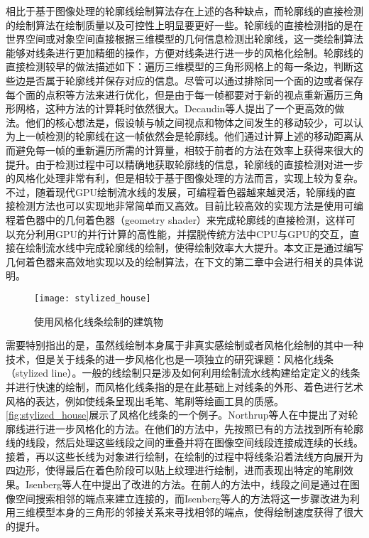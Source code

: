 相比于基于图像处理的轮廓线绘制算法存在上述的各种缺点，而轮廓线的直接检测的绘制算法在绘制质量以及可控性上明显要更好一些。轮廓线的直接检测指的是在世界空间或对象空间直接根据三维模型的几何信息检测出轮廓线，这一类绘制算法能够对线条进行更加精细的操作，方便对线条进行进一步的风格化绘制。轮廓线的直接检测较早的做法\cite{marshall2001cartoon}描述如下：遍历三维模型的三角形网格上的每一条边，判断这些边是否属于轮廓线并保存对应的信息。尽管可以通过排除同一个面的边或者保存每个面的点积等方法来进行优化，但是由于每一帧都要对于新的视点重新遍历三角形网格，这种方法的计算耗时依然很大。Decaudin等人提出了一个更高效的做法\cite{decaudin1996cartoon}。他们的核心想法是，假设帧与帧之间视点和物体之间发生的移动较少，可以认为上一帧检测的轮廓线在这一帧依然会是轮廓线。他们通过计算上述的移动距离从而避免每一帧的重新遍历所需的计算量，相较于前者的方法在效率上获得来很大的提升。由于检测过程中可以精确地获取轮廓线的信息，轮廓线的直接检测对进一步的风格化处理非常有利，但是相较于基于图像处理的方法而言，实现上较为复杂。不过，随着现代GPU绘制流水线的发展，可编程着色器越来越灵活，轮廓线的直接检测方法也可以实现地非常简单而又高效。目前比较高效的实现方法是使用可编程着色器中的几何着色器（geometry shader）来完成轮廓线的直接检测，这样可以充分利用GPU的并行计算的高性能，并摆脱传统方法中CPU与GPU的交互，直接在绘制流水线中完成轮廓线的绘制，使得绘制效率大大提升。本文正是通过编写几何着色器来高效地实现\con{}以及\scon{}的绘制算法，在下文的第二章中会进行相关的具体说明。

\begin{figure}[tbh]
    \centering
    \texttt{[image: stylized\_house]}
    \caption[使用风格化线条绘制的建筑物]{\label{fig:stylized_house}
    使用风格化线条绘制的建筑物\cite{northrup2000artistic}}
\end{figure}

需要特别指出的是，虽然线绘制本身属于非真实感绘制或者风格化绘制的其中一种技术，但是关于线条的进一步风格化也是一项独立的研究课题：风格化线条（stylized line）。一般的线绘制只是涉及如何利用绘制流水线构建给定定义的线条并进行快速的绘制，而风格化线条指的是在此基础上对线条的外形、着色进行艺术风格的表达，例如使线条呈现出毛笔、笔刷等绘画工具的质感。\autoref{fig:stylized_house}展示了风格化线条的一个例子。Northrup等人在\cite{northrup2000artistic}中提出了对轮廓线进行进一步风格化的方法。在他们的方法中，先按照已有的方法找到所有轮廓线的线段，然后处理这些线段之间的重叠并将在图像空间线段连接成连续的长线。接着，再以这些长线为对象进行绘制，在绘制的过程中将线条沿着法线方向展开为四边形，使得最后在着色阶段可以贴上纹理进行绘制，进而表现出特定的笔刷效果。Isenberg等人在\cite{isenberg2002stylizing}中提出了改进的方法。在前人的方法中，线段之间是通过在图像空间搜索相邻的端点来建立连接的，而Isenberg等人的方法将这一步骤改进为利用三维模型本身的三角形的邻接关系来寻找相邻的端点，使得绘制速度获得了很大的提升。

